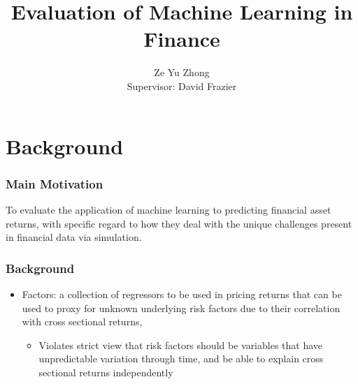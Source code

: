 \documentclass[]{beamer}
\title{Evaluation of Machine Learning in Finance}
\author{
	Ze Yu Zhong \\
	Supervisor: David Frazier
}
\institute{Monash University}
\date{}
\begin{document}
	
\begin{frame}[plain]
    \maketitle
\end{frame}

\section{Background}


\begin{frame}
\frametitle{Main Motivation}
To evaluate the application of machine learning to predicting financial asset returns, with specific regard to how they deal with the unique challenges present in financial data via simulation.
\end{frame}

\begin{frame}
\frametitle{Background}
\begin{itemize}
\item Factors: a collection of regressors to be used in pricing returns that can be used to proxy for unknown underlying risk factors due to their correlation with cross sectional returns, \citep{harvey__2016}
	\begin{itemize}
		\item Violates strict view that risk factors should be variables that have unpredictable variation through time, and be able to explain cross sectional returns independently
	\end{itemize}
\end{itemize}

\end{frame}
\end{document}
